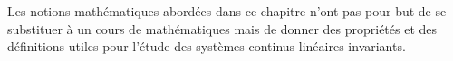 \documentclass[10pt,fleqn]{article} %
\begin{document}
%
%
%
%
%
%
%
%
%
%
%
%
%
%
%
%

Les notions mathématiques abordées dans ce chapitre n'ont pas pour but de se substituer à un cours de mathématiques mais de donner des propriétés et des définitions utiles pour l'étude des systèmes continus linéaires invariants.
\end{document}
